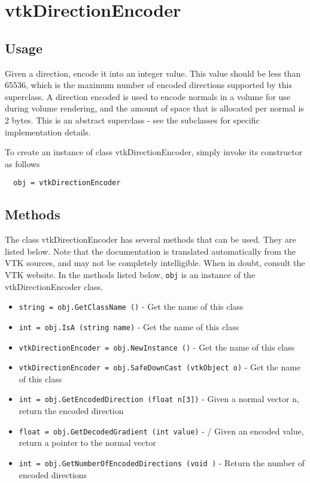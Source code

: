 \section{vtkDirectionEncoder}

\subsection{Usage}

 Given a direction, encode it into an integer value. This value should
 be less than 65536, which is the maximum number of encoded directions
 supported by this superclass. A direction encoded is used to encode
 normals in a volume for use during volume rendering, and the
 amount of space that is allocated per normal is 2 bytes.
 This is an abstract superclass - see the subclasses for specific 
 implementation details.


To create an instance of class vtkDirectionEncoder, simply
invoke its constructor as follows
\begin{verbatim}
  obj = vtkDirectionEncoder
\end{verbatim}
\subsection{Methods}

The class vtkDirectionEncoder has several methods that can be used.
  They are listed below.
Note that the documentation is translated automatically from the VTK sources,
and may not be completely intelligible.  When in doubt, consult the VTK website.
In the methods listed below, \verb|obj| is an instance of the vtkDirectionEncoder class.
\begin{itemize}
\item  \verb|string = obj.GetClassName ()| -  Get the name of this class

\item  \verb|int = obj.IsA (string name)| -  Get the name of this class

\item  \verb|vtkDirectionEncoder = obj.NewInstance ()| -  Get the name of this class

\item  \verb|vtkDirectionEncoder = obj.SafeDownCast (vtkObject o)| -  Get the name of this class

\item  \verb|int = obj.GetEncodedDirection (float n[3])| -  Given a normal vector n, return the encoded direction

\item  \verb|float = obj.GetDecodedGradient (int value)| - / Given an encoded value, return a pointer to the normal vector

\item  \verb|int = obj.GetNumberOfEncodedDirections (void )| -  Return the number of encoded directions

\end{itemize}
